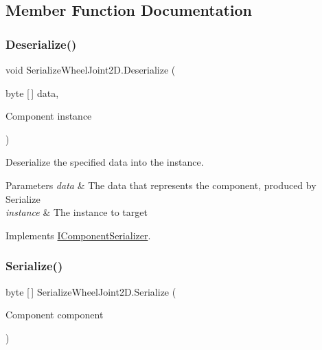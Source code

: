 \subsection{Member Function Documentation}
\mbox{\label{class_serialize_wheel_joint2_d_af4223b135bd9cf9be33639922944f9de}} 
\subsubsection{\texorpdfstring{Deserialize()}{Deserialize()}}
{\footnotesize\ttfamily void Serialize\+Wheel\+Joint2\+D.\+Deserialize (\begin{DoxyParamCaption}\item[{byte \mbox{[}$\,$\mbox{]}}]{data,  }\item[{Component}]{instance }\end{DoxyParamCaption})\hspace{0.3cm}{\ttfamily [inline]}}



Deserialize the specified data into the instance. 


\begin{DoxyParams}{Parameters}
{\em data} & The data that represents the component, produced by Serialize \\
\hline
{\em instance} & The instance to target \\
\hline
\end{DoxyParams}


Implements \hyperlink{interface_i_component_serializer_a4cc366a5c78b33d47a90c209d8fed883}{I\+Component\+Serializer}.

\mbox{\label{class_serialize_wheel_joint2_d_a832d5d2bce3ce68dfb32b5b00fd45719}} 
\subsubsection{\texorpdfstring{Serialize()}{Serialize()}}
{\footnotesize\ttfamily byte \mbox{[}$\,$\mbox{]} Serialize\+Wheel\+Joint2\+D.\+Serialize (\begin{DoxyParamCaption}\item[{Component}]{component }\end{DoxyParamCaption})\hspace{0.3cm}{\ttfamily [inline]}}



